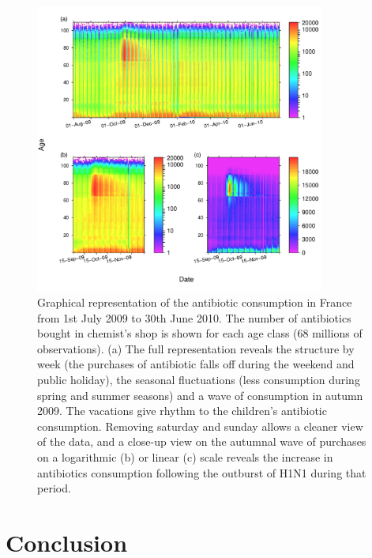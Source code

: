 \begin{figure}[!ht] %
\centering
\includegraphics[width=0.85\textwidth]{2_Methodo/Fig/Fig22-4.pdf}
\caption[Antibiotic consumption in France]{ Graphical representation of the antibiotic consumption in France from 1st July
2009 to 30th June 2010. The number of antibiotics bought in chemist’s shop is
shown for each age class (68 millions of observations). (a) The full
representation reveals the structure by week (the purchases of antibiotic falls
off during the weekend and public holiday), the seasonal fluctuations (less
consumption during spring and summer seasons) and a wave of consumption in
autumn 2009. The vacations give rhythm to the children’s antibiotic consumption.
Removing saturday and sunday allows a cleaner view of the data, and a close-up
view on the autumnal wave of purchases on a logarithmic (b) or linear (c) scale
reveals the increase in antibiotics consumption following the outburst of H1N1
during that period.
}
\label{Fig22-4}
\end{figure}


\section{Conclusion}

